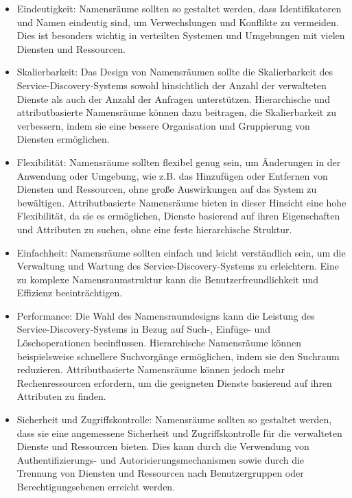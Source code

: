 \documentclass[../vs-script-first-v01.tex]{subfiles}
\begin{document}
\begin{itemize}
\item Eindeutigkeit: Namensräume sollten so gestaltet werden, dass Identifikatoren und Namen eindeutig sind, um Verwechslungen und Konflikte zu vermeiden. Dies ist besonders wichtig in verteilten Systemen und Umgebungen mit vielen Diensten und Ressourcen.
\item Skalierbarkeit: Das Design von Namensräumen sollte die Skalierbarkeit des Service-Discovery-Systems sowohl hinsichtlich der Anzahl der verwalteten Dienste als auch der Anzahl der Anfragen unterstützen. Hierarchische und attributbasierte Namensräume können dazu beitragen, die Skalierbarkeit zu verbessern, indem sie eine bessere Organisation und Gruppierung von Diensten ermöglichen.
\item Flexibilität: Namensräume sollten flexibel genug sein, um Änderungen in der Anwendung oder Umgebung, wie z.B. das Hinzufügen oder Entfernen von Diensten und Ressourcen, ohne große Auswirkungen auf das System zu bewältigen. Attributbasierte Namensräume bieten in dieser Hinsicht eine hohe Flexibilität, da sie es ermöglichen, Dienste basierend auf ihren Eigenschaften und Attributen zu suchen, ohne eine feste hierarchische Struktur.
\item Einfachheit: Namensräume sollten einfach und leicht verständlich sein, um die Verwaltung und Wartung des Service-Discovery-Systems zu erleichtern. Eine zu komplexe Namensraumstruktur kann die Benutzerfreundlichkeit und Effizienz beeinträchtigen.
\item Performance: Die Wahl des Namensraumdesigns kann die Leistung des Service-Discovery-Systems in Bezug auf Such-, Einfüge- und Löschoperationen beeinflussen. Hierarchische Namensräume können beispielsweise schnellere Suchvorgänge ermöglichen, indem sie den Suchraum reduzieren. Attributbasierte Namensräume können jedoch mehr Rechenressourcen erfordern, um die geeigneten Dienste basierend auf ihren Attributen zu finden.
\item Sicherheit und Zugriffskontrolle: Namensräume sollten so gestaltet werden, dass sie eine angemessene Sicherheit und Zugriffskontrolle für die verwalteten Dienste und Ressourcen bieten. Dies kann durch die Verwendung von Authentifizierungs- und Autorisierungsmechanismen sowie durch die Trennung von Diensten und Ressourcen nach Benutzergruppen oder Berechtigungsebenen erreicht werden.
\end{itemize}
\end{document}
